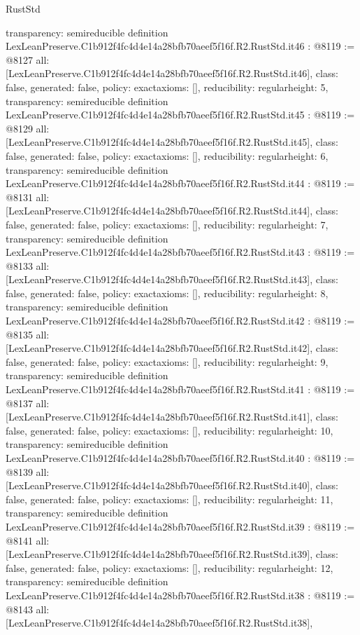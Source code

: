 \begin{lexlean}{RustStd}
\begin{coremodule}
{  transparency: semireducible
}
definition LexLeanPreserve.C1b912f4fc4d4e14a28bfb70aeef5f16f.R2.RustStd.it46 : @8119 := @8127 {
  all: [LexLeanPreserve.C1b912f4fc4d4e14a28bfb70aeef5f16f.R2.RustStd.it46],
  class: false,
  generated: false,
  policy: exact{axioms: []},
  reducibility: regular{height: 5},
  transparency: semireducible
}
definition LexLeanPreserve.C1b912f4fc4d4e14a28bfb70aeef5f16f.R2.RustStd.it45 : @8119 := @8129 {
  all: [LexLeanPreserve.C1b912f4fc4d4e14a28bfb70aeef5f16f.R2.RustStd.it45],
  class: false,
  generated: false,
  policy: exact{axioms: []},
  reducibility: regular{height: 6},
  transparency: semireducible
}
definition LexLeanPreserve.C1b912f4fc4d4e14a28bfb70aeef5f16f.R2.RustStd.it44 : @8119 := @8131 {
  all: [LexLeanPreserve.C1b912f4fc4d4e14a28bfb70aeef5f16f.R2.RustStd.it44],
  class: false,
  generated: false,
  policy: exact{axioms: []},
  reducibility: regular{height: 7},
  transparency: semireducible
}
definition LexLeanPreserve.C1b912f4fc4d4e14a28bfb70aeef5f16f.R2.RustStd.it43 : @8119 := @8133 {
  all: [LexLeanPreserve.C1b912f4fc4d4e14a28bfb70aeef5f16f.R2.RustStd.it43],
  class: false,
  generated: false,
  policy: exact{axioms: []},
  reducibility: regular{height: 8},
  transparency: semireducible
}
definition LexLeanPreserve.C1b912f4fc4d4e14a28bfb70aeef5f16f.R2.RustStd.it42 : @8119 := @8135 {
  all: [LexLeanPreserve.C1b912f4fc4d4e14a28bfb70aeef5f16f.R2.RustStd.it42],
  class: false,
  generated: false,
  policy: exact{axioms: []},
  reducibility: regular{height: 9},
  transparency: semireducible
}
definition LexLeanPreserve.C1b912f4fc4d4e14a28bfb70aeef5f16f.R2.RustStd.it41 : @8119 := @8137 {
  all: [LexLeanPreserve.C1b912f4fc4d4e14a28bfb70aeef5f16f.R2.RustStd.it41],
  class: false,
  generated: false,
  policy: exact{axioms: []},
  reducibility: regular{height: 10},
  transparency: semireducible
}
definition LexLeanPreserve.C1b912f4fc4d4e14a28bfb70aeef5f16f.R2.RustStd.it40 : @8119 := @8139 {
  all: [LexLeanPreserve.C1b912f4fc4d4e14a28bfb70aeef5f16f.R2.RustStd.it40],
  class: false,
  generated: false,
  policy: exact{axioms: []},
  reducibility: regular{height: 11},
  transparency: semireducible
}
definition LexLeanPreserve.C1b912f4fc4d4e14a28bfb70aeef5f16f.R2.RustStd.it39 : @8119 := @8141 {
  all: [LexLeanPreserve.C1b912f4fc4d4e14a28bfb70aeef5f16f.R2.RustStd.it39],
  class: false,
  generated: false,
  policy: exact{axioms: []},
  reducibility: regular{height: 12},
  transparency: semireducible
}
definition LexLeanPreserve.C1b912f4fc4d4e14a28bfb70aeef5f16f.R2.RustStd.it38 : @8119 := @8143 {
  all: [LexLeanPreserve.C1b912f4fc4d4e14a28bfb70aeef5f16f.R2.RustStd.it38],
}
\end{coremodule}
\end{lexlean}
